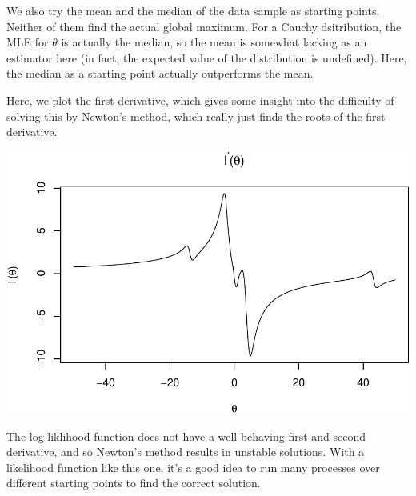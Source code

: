\documentclass[]{article}
\newenvironment{Shaded}{\begin{snugshade}}{\end{snugshade}}
\newcommand{\KeywordTok}[1]{\textcolor[rgb]{0.13,0.29,0.53}{\textbf{#1}}}
\newcommand{\DataTypeTok}[1]{\textcolor[rgb]{0.13,0.29,0.53}{#1}}
\newcommand{\CharTok}[1]{\textcolor[rgb]{0.31,0.60,0.02}{#1}}
\newcommand{\StringTok}[1]{\textcolor[rgb]{0.31,0.60,0.02}{#1}}
\newcommand{\NormalTok}[1]{#1}
\begin{document}
We also try the mean and the median of the data sample as starting
points. Neither of them find the actual global maximum. For a Cauchy
dsitribution, the MLE for \(\theta\) is actually the median, so the mean
is somewhat lacking as an estimator here (in fact, the expected value of
the distribution is undefined). Here, the median as a starting point
actually outperforms the mean.

Here, we plot the first derivative, which gives some insight into the
difficulty of solving this by Newton's method, which really just finds
the roots of the first derivative.

\begin{Shaded}
\end{Shaded}

\includegraphics{Atlas-PS_2_files/figure-latex/unnamed-chunk-8-1.pdf}

The log-liklihood function does not have a well behaving first and
second derivative, and so Newton's method results in unstable solutions.
With a likelihood function like this one, it's a good idea to run many
processes over different starting points to find the correct solution.
\end{document}
